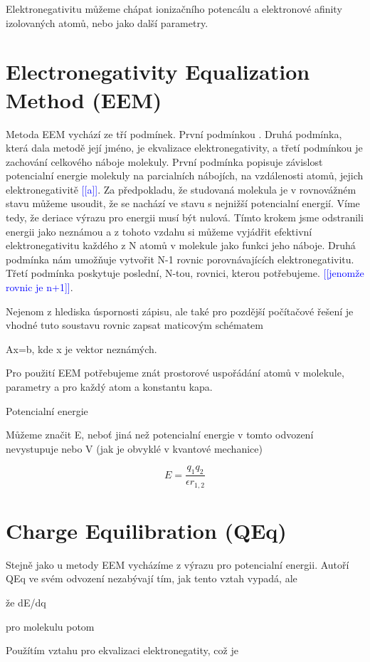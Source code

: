 \documentclass[10pt,draft,oneside]{fithesis2}
\newcommand\todo[1]{\textcolor{blue}{[[#1]]}}
\begin{document}
Elektronegativitu můžeme chápat ionizačního potencálu a elektronové afinity izolovaných atomů, nebo jako další parametry.

\section{Electronegativity Equalization Method (EEM)}

Metoda EEM vychází ze tří podmínek. První podmínkou . Druhá podmínka, která dala metodě její jméno, je ekvalizace elektronegativity, a třetí podmínkou je zachování celkového náboje molekuly. První podmínka popisuje závislost potencialní energie molekuly na parcialních nábojích, na vzdálenosti atomů, jejich elektronegativitě \todo{a}. Za předpokladu, že studovaná molekula je v rovnovážném stavu můžeme usoudit, že se nachází ve stavu s nejnižší potencialní energií. Víme tedy, že deriace výrazu pro energii musí být nulová. Tímto krokem jsme odstranili energii jako neznámou a z tohoto vzdahu si můžeme vyjádřit efektivní elektronegativitu každého z N atomů v molekule jako funkci jeho náboje. Druhá podmínka nám umožňuje vytvořit N-1 rovnic porovnávajících elektronegativitu. Třetí podmínka poskytuje poslední, N-tou, rovnici, kterou potřebujeme. \todo{jenomže rovnic je n+1}.

Nejenom z hlediska úspornosti zápisu, ale také pro pozdější počítačové řešení je vhodné tuto soustavu rovnic zapsat maticovým schématem

Ax=b, kde x je vektor neznámých.

Pro použití EEM potřebujeme znát prostorové uspořádání atomů v molekule, parametry a pro každý atom a konstantu kapa.

Potencialní energie

Můžeme značit E, neboť jiná než potencialní energie v tomto odvození nevystupuje nebo V (jak je obvyklé v kvantové mechanice)

$$E=\frac{q_1 q_2}{\epsilon r_{1,2}}$$


\section{Charge Equilibration (QEq)}

Stejně jako u metody EEM vycházíme z výrazu pro potencialní energii. Autoří QEq ve svém odvození nezabývají tím, jak tento vztah vypadá, ale 

že dE/dq

pro molekulu potom


Použítím vztahu pro ekvalizaci elektronegatity, což je 
\end{document}
